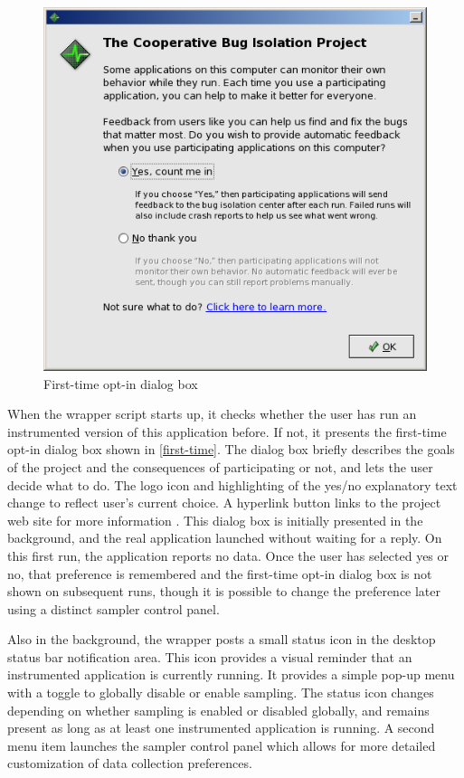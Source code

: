 \documentclass[10pt,twocolumn]{article}
\begin{document}
\begin{figure}
  \centering
  \includegraphics[width=\columnwidth]{first-time}
  \caption{First-time opt-in dialog box}
  \label{first-time}
\end{figure}

When the wrapper script starts up, it checks whether the user has run
an instrumented version of this application before.  If not, it
presents the first-time opt-in dialog box shown in
\autoref{first-time}. The dialog box briefly describes the goals of
the project and the consequences of participating or not, and lets the
user decide what to do.  The logo icon and highlighting of the yes/no
explanatory text change to reflect user's current choice.  A hyperlink
button links to the project web site for more information
\cite{Liblit:CBIP}.  This dialog box is initially presented in the
background, and the real application launched without waiting for a
reply.  On this first run, the application reports no data. Once the
user has selected yes or no, that preference is remembered and the
first-time opt-in dialog box is not shown on subsequent runs, though
it is possible to change the preference later using a distinct sampler
control panel.

Also in the background, the wrapper posts a small status icon in
the desktop status bar notification area.  This icon provides a
visual reminder that an instrumented application is currently
running. It provides a simple pop-up menu with a toggle to globally
disable or enable sampling.  The status icon changes depending on
whether sampling is enabled or disabled globally, and remains present
as long as at least one instrumented application is running.  A second
menu item launches the sampler control panel which allows for
more detailed customization of data collection preferences.
\end{document}
